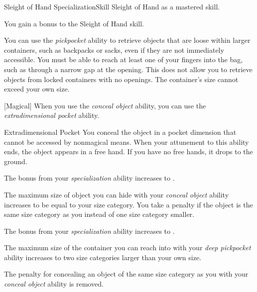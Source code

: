     \begin{feat}{Sleight of Hand Specialization}{Skill}
        \featpre Sleight of Hand as a mastered skill.

         You gain a  bonus to the Sleight of Hand skill.

         You can use the \textit{pickpocket} ability to retrieve objects that are loose within larger containers, such as backpacks or sacks, even if they are not immediately accessible.
        You must be able to reach at least one of your fingers into the bag, such as through a narrow gap at the opening.
        This does not allow you to retrieve objects from locked containers with no openings.
        The container's size cannot exceed your own size.

        [Magical] When you use the \textit{conceal object} ability, you can use the \textit{extradimensional pocket} ability.
        \begin{attuneability}{Extradimensional Pocket}
            \rankline
            You conceal the object in a pocket dimension that cannot be accessed by nonmagical means.
            When your attunement to this ability ends, the object appears in a free hand.
            If you have no free hands, it drops to the ground.
        \end{attuneability}

         The bonus from your \textit{specialization} ability increases to .

         The maximum size of object you can hide with your \textit{conceal object} ability increases to be equal to your size category.
        You take a  penalty if the object is the same size category as you instead of one size category smaller.

         The bonus from your \textit{specialization} ability increases to .

         The maximum size of the container you can reach into with your \textit{deep pickpocket} ability increases to two size categories larger than your own size.

         The  penalty for concealing an object of the same size category as you with your \textit{conceal object} ability is removed.
    \end{feat}

